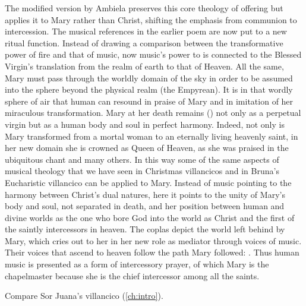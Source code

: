 The modified version by Ambiela preserves this core theology of offering but
applies it to Mary rather than Christ, shifting the emphasis from communion to
intercession.
The musical references in the earlier poem are now put to a new ritual function.
Instead of drawing a comparison between the transformative power of fire and
that of music, now music's power to  is connected to
the Blessed Virgin's translation from the realm of earth to that of Heaven.
All the same, Mary must pass through the worldly domain of the sky in order to
be assumed into the sphere beyond the physical realm (the Empyrean).
It is in that wordly sphere of air that human  can
resound in praise of Mary and in imitation of her miraculous transformation.
Mary at her death remains  () not only as a
perpetual virgin but as a human body and soul in perfect harmony.  
Indeed, not only is Mary transformed from a mortal woman to an eternally living
heavenly saint, in her new domain she is crowned as Queen of Heaven, as she was
praised in the ubiquitous  chant and many others.
In this way some of the same aspects of musical theology that we have seen in
Christmas villancicos and in Bruna's Eucharistic villancico can be applied to
Mary.  
Instead of music pointing to the harmony between Christ's dual natures, here it
points to the unity of Mary's body and soul, not separated in death, and her
position between human and divine worlds as the one who bore God into the world
as Christ and the first of the saintly intercessors in heaven.
The coplas depict the world left behind by Mary, which cries out to her in her
new role as mediator through voices of music.
Their voices that ascend to heaven follow the path Mary followed: .
Thus human music is presented as a form of intercessory prayer, of which Mary
is the chapelmaster because she is the chief intercessor among all the saints.%
\begin{Footnote}
    Compare Sor Juana's villancico 
    (\cref{ch:intro}).
\end{Footnote}

\endinput

\section{Christ as a \term{Vihuela} in \wtitle{Qué música divina} by José de Cáseda}
\label{sec:Caseda}

